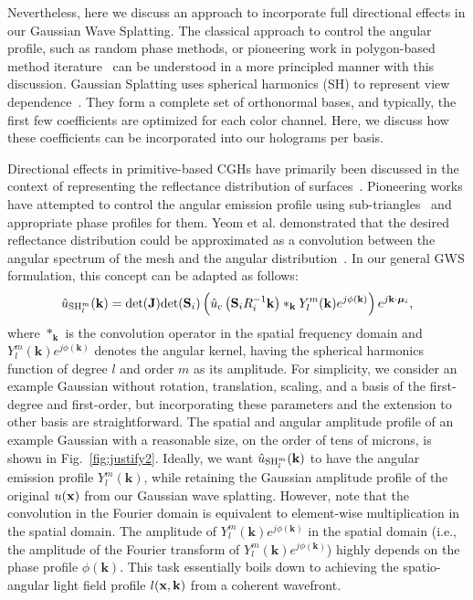 Nevertheless, here we discuss an approach to incorporate full directional effects in our Gaussian Wave Splatting. The classical approach to control the angular profile, such as random phase methods, or pioneering work in polygon-based method iterature~\cite{kim2008mathematical, ahrenberg2008computer, park2015removal, askari2017occlusion, zhang2018fast} can be understood in a more principled manner with this discussion. Gaussian Splatting uses spherical harmonics (SH) to represent view dependence~\cite{basri2003lambertian, yu_and_fridovichkeil2021plenoxels, kerbl3Dgaussians}. They form a complete set of orthonormal bases, and typically, the first few coefficients are optimized for each color channel. Here, we discuss how these coefficients can be incorporated into our holograms per basis. 

Directional effects in primitive-based CGHs have primarily been discussed in the context of representing the reflectance distribution of surfaces~\cite{park2017recent}. Pioneering works have attempted to control the angular emission profile using sub-triangles~\cite{kim2008mathematical} and appropriate phase profiles for them. Yeom et al. demonstrated that the desired reflectance distribution could be approximated as a convolution between the angular spectrum of the mesh and the angular distribution~\cite{askari2017occlusion, yeom2016calculation}. In our general GWS formulation, this concept can be adapted as follows:
\begin{align}
    \hat{u}_{\textrm{SH}_l^m} ( \mathbf{k} ) =  \textrm{det} ( \mathbf{J}) \textrm{det}(\mathbf{S}_i) \left( \hat{u}_c \left(\mathbf{S}_i R_i^{-1}\mathbf{k} \right) \ast_{\mathbf{k}} Y_l^m(\mathbf{k}) e^{j\phi (\mathbf{k})} \right) e^{j  \mathbf{k} \cdot \bm{\mu}_i} \label{eq:convolution},
\end{align}
where $\ast_{\mathbf{k}}$ is the convolution operator in the spatial frequency domain and $Y_l^m(\mathbf{k}) e^{j\phi (\mathbf{k})}$ denotes the angular kernel, having the spherical harmonics function of degree $l$ and order $m$ as its amplitude. For simplicity, we consider an example Gaussian without rotation, translation, scaling, and a basis of the first-degree and first-order, but incorporating these parameters and the extension to other basis are straightforward. The spatial and angular amplitude profile of an example Gaussian with a reasonable size, on the order of tens of microns, is shown in Fig.~\ref{fig:justify2}. Ideally, we want $\hat{u}_{\textrm{SH}_l^m} ( \mathbf{k})$ to have the angular emission profile $Y_l^m(\mathbf{k})$, while retaining the Gaussian amplitude profile of the original $u(\mathbf{x})$ from our Gaussian wave splatting. However, note that the convolution in the Fourier domain is equivalent to element-wise multiplication in the spatial domain. The amplitude of $Y_l^m(\mathbf{k}) e^{j\phi (\mathbf{k})}$ in the spatial domain (i.e., the amplitude of the Fourier transform of $Y_l^m(\mathbf{k}) e^{j\phi (\mathbf{k})}$) highly depends on the phase profile $\phi (\mathbf{k})$. This task essentially boils down to achieving the spatio-angular light field profile $l(\mathbf{x}, \mathbf{k})$ from a coherent wavefront.

